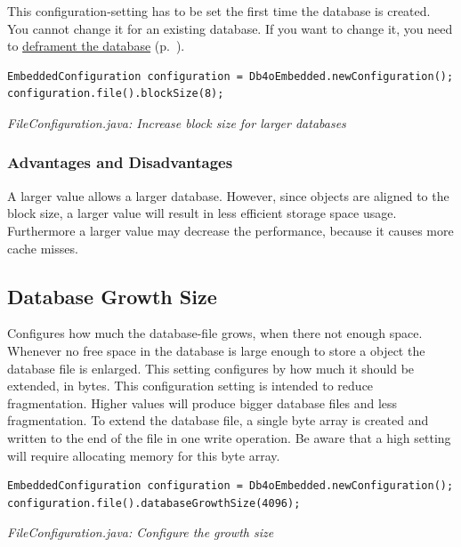 This configuration-setting has to be set the first time the database is created. You cannot change it for an existing database. If you want to change it, you need to \hyperref[ref:troubleshoot-increasing-the-maximum-database-file-size]{deframent the database} (p.~\pageref{ref:troubleshoot-increasing-the-maximum-database-file-size}).

\begin{lstlisting}
EmbeddedConfiguration configuration = Db4oEmbedded.newConfiguration();
configuration.file().blockSize(8);
\end{lstlisting}

{\small\itshape FileConfiguration.java: Increase block size for larger databases\par}
\medskip

\subsubsection*{Advantages and Disadvantages}

A larger value allows a larger database. However, since objects are aligned to the block size, a larger value will result in less efficient storage space usage. Furthermore a larger value may decrease the performance, because it causes more cache misses.

\subsection{Database Growth Size}
\label{ref:configuration-file-database-growth-size}

Configures how much the database-file grows, when there not enough space. Whenever no free space in the database is large enough to store a object the database file is enlarged. This setting configures by how much it should be extended, in bytes. This configuration setting is intended to reduce fragmentation. Higher values will produce bigger database files and less fragmentation. To extend the database file, a single byte array is created and written to the end of the file in one write operation. Be aware that a high setting will require allocating memory for this byte array.

\begin{lstlisting}
EmbeddedConfiguration configuration = Db4oEmbedded.newConfiguration();
configuration.file().databaseGrowthSize(4096);
\end{lstlisting}

{\small\itshape FileConfiguration.java: Configure the growth size\par}
\medskip

